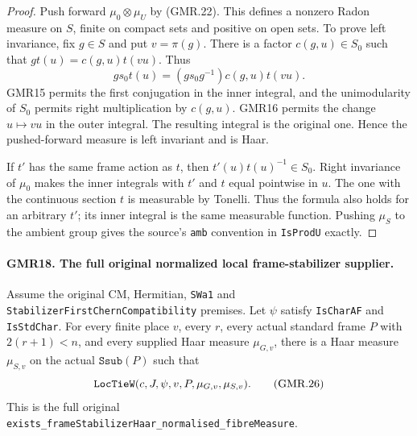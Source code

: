 \documentclass[11pt,a4paper]{article}
\numberwithin{equation}{section}
\theoremstyle{remark}\newtheorem{remark}[theorem]{Remark}
\begin{document}
\begin{proof}
Push forward $\mu_0\otimes\mu_U$ by (GMR.22).  This defines a
nonzero Radon measure on $S$, finite on compact sets and positive on
open sets.  To prove left invariance, fix $g\in S$ and put
$v=\pi(g)$.  There is a factor $c(g,u)\in S_0$ such that
$g t(u)=c(g,u)t(vu)$.  Thus
\[
 g s_0 t(u)=(g s_0 g^{-1})c(g,u)t(vu).
\]
GMR15 permits the first conjugation in the inner integral, and the
unimodularity of $S_0$ permits right multiplication by $c(g,u)$.
GMR16 permits the change $u\mapsto vu$ in the outer integral.
The resulting integral is the original one.  Hence the pushed-forward
measure is left invariant and is Haar.

If $t'$ has the same frame action as $t$, then
$t'(u)t(u)^{-1}\in S_0$.  Right invariance of $\mu_0$ makes the inner
integrals with $t'$ and $t$ equal pointwise in $u$.  The one with the
continuous section $t$ is measurable by Tonelli.  Thus the formula
also holds for an arbitrary $t'$; its inner integral is the same
measurable function.  Pushing $\mu_S$ to the ambient group gives
the source's \texttt{amb} convention in \texttt{Is\allowbreak Prod\allowbreak U} exactly.
\end{proof}

\paragraph{GMR18. The full original normalized local frame-stabilizer supplier.}
\label{claim:GMR18}
Assume the original CM, Hermitian, \texttt{SWa1} and
\texttt{Stabilizer\allowbreak First\allowbreak Chern\allowbreak Compatibility} premises.  Let $\psi$
satisfy \texttt{Is\allowbreak Char\allowbreak AF} and \texttt{Is\allowbreak Std\allowbreak Char}.  For every finite
place $v$, every $r$, every actual standard frame $P$ with
$2(r+1)<n$, and every supplied Haar measure $\mu_{G,v}$, there is a
Haar measure $\mu_{S,v}$ on the actual $\texttt{Ssub}(P)$ such that
\[
 \texttt{Loc\allowbreak Tie\allowbreak W}(c,J,\psi,v,P,\mu_{G,v},\mu_{S,v}).
 \tag{GMR.26}
\]
This is the full original
\texttt{exists\_\allowbreak frame\allowbreak Stabilizer\allowbreak Haar\_\allowbreak normalised\_\allowbreak fibre\allowbreak Measure}.
\end{document}
